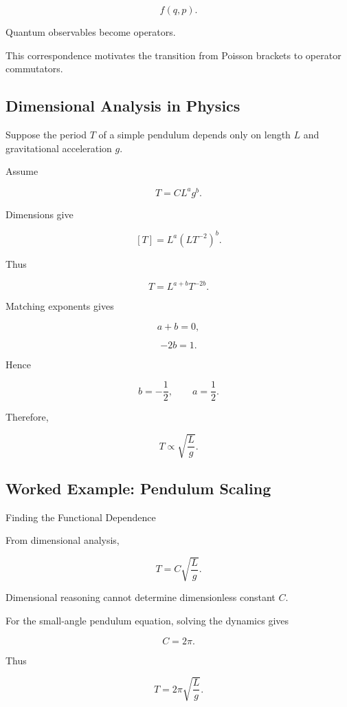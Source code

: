 \[
f(q,p).
\]

Quantum observables become operators.

This correspondence motivates the transition from Poisson brackets to
operator commutators.

\subsection{Dimensional Analysis in Physics}
\label{subsec:dimensional-analysis-physics}

Suppose the period \(T\) of a simple pendulum depends only on length \(L\)
and gravitational acceleration \(g\).

Assume

\[
T
=
C L^a g^b.
\]

Dimensions give

\[
[T]
=
L^a
(LT^{-2})^b.
\]

Thus

\[
T
=
L^{a+b}
T^{-2b}.
\]

Matching exponents gives

\[
a+b=0,
\]

\[
-2b=1.
\]

Hence

\[
b=-\frac12,
\qquad
a=\frac12.
\]

Therefore,

\[
\boxed{
T
\propto
\sqrt{\frac{L}{g}}.
}
\]

\subsection{Worked Example: Pendulum Scaling}
\label{subsec:worked-pendulum-scaling}

\begin{workedexamplebox}{Finding the Functional Dependence}

From dimensional analysis,

\[
T
=
C
\sqrt{\frac{L}{g}}.
\]

Dimensional reasoning cannot determine dimensionless constant \(C\).

For the small-angle pendulum equation, solving the dynamics gives

\[
C=2\pi.
\]

Thus

\begin{answerbox}
\[
\boxed{
T
=
2\pi
\sqrt{\frac{L}{g}}.
}
\]
\end{answerbox}

\end{workedexamplebox}


